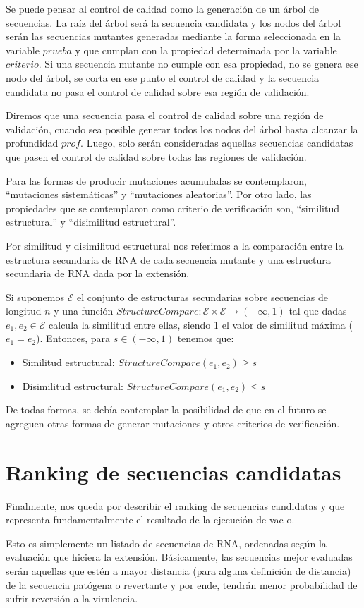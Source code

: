 Se puede pensar al control de calidad como la generaci\'on de un \'arbol de
secuencias. La ra\'iz del \'arbol ser\'a la secuencia candidata y los nodos del
\'arbol ser\'an las secuencias mutantes generadas mediante la forma seleccionada
en la variable $prueba$ y que cumplan con la propiedad determinada por la
variable $criterio$. Si una secuencia mutante no cumple con esa propiedad, no se
genera ese nodo del \'arbol, se corta en ese punto el control de calidad y la
secuencia candidata no pasa el control de calidad sobre esa regi\'on de
validaci\'on.

Diremos que una secuencia pasa el control de calidad sobre una regi\'on de
validaci\'on, cuando sea posible generar todos los nodos del \'arbol hasta
alcanzar la profundidad $prof$. Luego, solo ser\'an consideradas aquellas
secuencias candidatas que pasen el control de calidad sobre todas las regiones
de validaci\'on.

Para las formas de producir mutaciones acumuladas se contemplaron, ``mutaciones
sistem\'aticas'' y ``mutaciones aleatorias''. Por otro lado, las propiedades
que se contemplaron como criterio de verificaci\'on son, ``similitud
estructural'' y ``disimilitud estructural''.

Por similitud y disimilitud estructural nos referimos a la comparaci\'on entre
la estructura secundaria de \ac{RNA} de cada secuencia mutante y una estructura
secundaria de \ac{RNA} dada por la extensi\'on. 

Si suponemos $\mathcal{E}$ el conjunto de estructuras secundarias sobre
secuencias de longitud $n$ y una funci\'on $StructureCompare : \mathcal{E}
\times \mathcal{E} \rightarrow (-\infty, 1)$ tal que dadas $e_{1},e_{2} \in
\mathcal{E}$ calcula la similitud entre ellas, siendo 1 el valor de similitud
m\'axima ($e_{1} = e_{2}$). Entonces, para $s \in (-\infty, 1)$ tenemos que:
\begin{itemize}
 \item Similitud estructural: $StructureCompare(e_{1}, e_{2}) \ge s$
 \item Disimilitud estructural: $StructureCompare(e_{1}, e_{2}) \le s$
\end{itemize}

De todas formas, se deb\'ia contemplar la posibilidad de que en el
futuro se agreguen otras formas de generar mutaciones y otros criterios de
verificaci\'on.

\section{Ranking de secuencias candidatas}

Finalmente, nos queda por describir el ranking de secuencias candidatas y que
representa fundamentalmente el resultado de la ejecuci\'on de \ac{vac-o}.

Esto es simplemente un listado de secuencias de \ac{RNA}, ordenadas seg\'un la
evaluaci\'on que hiciera la extensi\'on. B\'asicamente, las secuencias mejor
evaluadas ser\'an aquellas que est\'en a mayor distancia (para alguna
definici\'on de distancia) de la secuencia pat\'ogena o revertante y por ende,
tendr\'an menor probabilidad de sufrir reversi\'on a la virulencia.